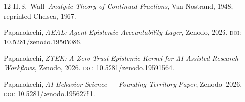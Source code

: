 \documentclass[11pt,a4paper]{article}
\theoremstyle{plain}
\theoremstyle{definition}
\theoremstyle{remark}
\begin{document}
\begin{thebibliography}{12}
H.\,S.~Wall,
\emph{Analytic Theory of Continued Fractions},
Van Nostrand, 1948; reprinted Chelsea, 1967.

Papanokechi,
\textit{AEAL: Agent Epistemic Accountability Layer},
Zenodo, 2026.
\textsc{doi}: \href{https://doi.org/10.5281/zenodo.19565086}{10.5281/zenodo.19565086}.

Papanokechi,
\textit{ZTEK: A Zero Trust Epistemic Kernel for AI-Assisted Research
Workflows},
Zenodo, 2026.
\textsc{doi}: \href{https://doi.org/10.5281/zenodo.19591564}{10.5281/zenodo.19591564}.

Papanokechi,
\textit{AI Behavior Science --- Founding Territory Paper},
Zenodo, 2026.
\textsc{doi}: \href{https://doi.org/10.5281/zenodo.19562751}{10.5281/zenodo.19562751}.

\end{thebibliography}
\end{document}
